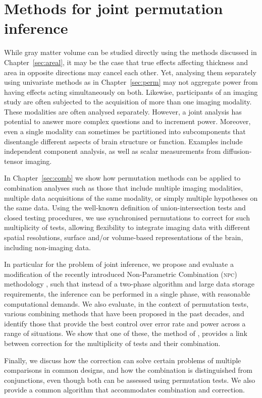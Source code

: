 \section{Methods for joint permutation inference}

While gray matter volume can be studied directly using the methods discussed in Chapter~\ref{sec:areal}, it may be the case that true effects affecting thickness and area in opposite directions may cancel each other. Yet, analysing them separately using univariate methods as in Chapter~\ref{sec:perm} may not aggregate power from having effects acting simultaneously on both. Likewise, participants of an imaging study are often subjected to the acquisition of more than one imaging modality. These modalities are often analysed separately. However, a joint analysis has potential to answer more complex questions and to increment power. Moreover, even a single modality can sometimes be partitioned into subcomponents that disentangle different aspects of brain structure or function. Examples include independent component analysis, as well as scalar measurements from diffusion-tensor imaging. 

In Chapter~\ref{sec:comb} we show how permutation methods can be applied to combination analyses such as those that include multiple imaging modalities, multiple data acquisitions of the same modality, or simply multiple hypotheses on the same data. Using the well-known definition of union-intersection tests and closed testing procedures, we use synchronised permutations to correct for such multiplicity of tests, allowing flexibility to integrate imaging data with different spatial resolutions, surface and/or volume-based representations of the brain, including non-imaging data.

In particular for the problem of joint inference, we propose and evaluate a modification of the recently introduced Non-Parametric Combination (\textsc{npc}) methodology \citep{Pesarin2010}, such that instead of a two-phase algorithm and large data storage requirements, the inference can be performed in a single phase, with reasonable computational demands. We also evaluate, in the context of permutation tests, various combining methods that have been proposed in the past decades, and identify those that provide the best control over error rate and power across a range of situations. We show that one of these, the method of \citet{Tippett1931}, provides a link between correction for the multiplicity of tests and their combination.

Finally, we discuss how the correction can solve certain problems of multiple comparisons in common designs, and how the combination is distinguished from conjunctions, even though both can be assessed using permutation tests. We also provide a common algorithm that accommodates combination and correction.